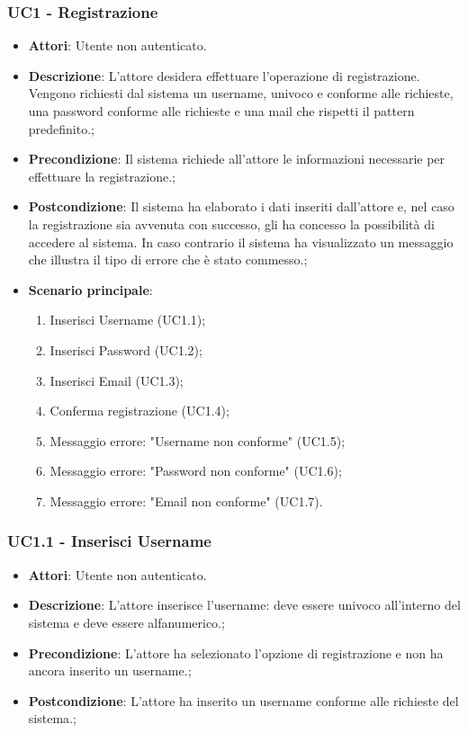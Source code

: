 \subsubsection{UC1 - Registrazione} 
\label{sssec:UC1} 
\begin{itemize} 
\item \textbf{Attori}: Utente non autenticato.
\item \textbf{Descrizione}: L'attore desidera effettuare l'operazione di registrazione. Vengono richiesti dal sistema un username, univoco e conforme alle richieste, una password conforme alle richieste e una mail che rispetti il pattern predefinito.;
\item \textbf{Precondizione}: Il sistema richiede all'attore le informazioni necessarie per effettuare
la registrazione.;
\item \textbf{Postcondizione}: Il sistema ha elaborato i dati inseriti dall'attore e, nel caso la registrazione
sia avvenuta con successo, gli ha concesso la possibilità di accedere al sistema.
In caso contrario il sistema ha visualizzato un messaggio che illustra il tipo di errore che è stato commesso.;
\item \textbf{Scenario principale}: \begin{enumerate}\item Inserisci Username (UC1.1);\item Inserisci Password (UC1.2);\item Inserisci Email (UC1.3);\item Conferma registrazione (UC1.4);\item Messaggio errore: "Username non conforme" (UC1.5);\item Messaggio errore: "Password non conforme" (UC1.6);\item Messaggio errore: "Email non conforme" (UC1.7). 
 \end{enumerate}
\end{itemize} 
\subsubsection{UC1.1 - Inserisci Username} 
\label{sssec:UC1.1} 
\begin{itemize} 
\item \textbf{Attori}: Utente non autenticato.
\item \textbf{Descrizione}: L’attore inserisce l'username: deve essere univoco all'interno del sistema e deve essere alfanumerico.;
\item \textbf{Precondizione}: L'attore ha selezionato l'opzione di registrazione e non ha ancora inserito un username.;
\item \textbf{Postcondizione}: L'attore ha inserito un username conforme alle richieste del sistema.;
\end{itemize} 

